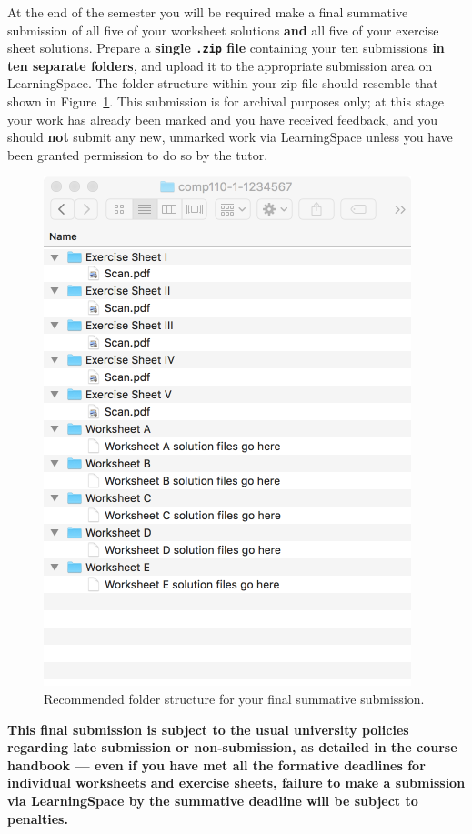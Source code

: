 \documentclass{../../fal_assignment}
\begin{document}
At the end of the semester you will be required make a final summative submission of all five of your worksheet solutions \textbf{and} all five of your exercise sheet solutions.
Prepare a \textbf{single \texttt{.zip} file} containing your ten submissions \textbf{in ten separate folders}, and upload it to the appropriate submission area on LearningSpace. The folder structure within your zip file should resemble that shown in Figure~\ref{fig:folder_structure}.
This submission is for archival purposes only; at this stage your work has already been marked and you have received feedback, and you should \textbf{not} submit any new, unmarked work via LearningSpace unless you have been granted permission to do so by the tutor.
\begin{figure}
    \begin{center}
        \includegraphics[height=0.4\textheight]{folder_structure}
    \end{center}
    \caption{Recommended folder structure for your final summative submission.}
    \label{fig:folder_structure}
\end{figure}

\textbf{This final submission is subject to the usual university policies regarding late submission or non-submission,
as detailed in the course handbook ---
even if you have met all the formative deadlines for individual worksheets and exercise sheets,
failure to make a submission via LearningSpace by the summative deadline will be subject to penalties.}
\end{document}
